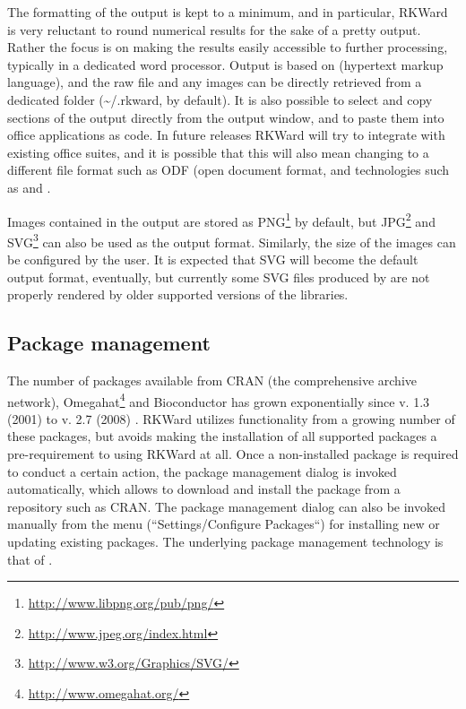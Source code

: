 The formatting of the output is kept to a minimum, and in particular,
RKWard is very reluctant to round numerical results for the sake of a
pretty output. Rather the focus is on making the results easily
accessible to further processing, typically in a dedicated word
processor. Output is based on
 (hypertext markup language), and the raw
 file and any images can be directly
retrieved from a dedicated folder
(\~{}/.rkward, by default). It is also
possible to select and copy sections of the output directly from the
output window, and to paste them into office applications as
 code. In future releases RKWard will
try to integrate with existing office suites, and it is possible that
this will also mean changing to a different file format such as ODF (open
document format, and technologies such as  and 
\citep{Leisch2002, Kuhn2006}.

Images contained in the output are stored as
PNG\footnote{\url{http://www.libpng.org/pub/png/}} by
default, but JPG\footnote{\url{http://www.jpeg.org/index.html}} and
SVG\footnote{\url{http://www.w3.org/Graphics/SVG/}}
can also be used as the output format. Similarly, the size of the
images can be configured by the user. It is expected that SVG will
become the default output format, eventually, but currently some SVG
files produced by  are not properly
rendered by older supported versions of the
 libraries.

\subsection{Package management}
\label{sec:package_management}
The number of  packages available from CRAN (the comprehensive  archive
network), Omegahat\footnote{\url{http://www.omegahat.org/}} and Bioconductor \citep{Gentleman2004} has grown exponentially since  v. 1.3
(2001) to  v. 2.7 (2008) \citep{Fox2008, Ligges2003, Visne2009}. RKWard
utilizes functionality from a growing number of these packages, but avoids
making the installation of all supported packages a pre-requirement to using
RKWard at all. Once a non-installed package is required to conduct a certain
action, the package management dialog is invoked automatically, which allows to
download and install the package from a repository such as CRAN. The package
management dialog can also be invoked manually from the menu
(``Settings/Configure Packages``) for installing new or updating existing 
packages. The underlying package management technology is that of 
\citep{Ligges2003, Ripley2005}.

